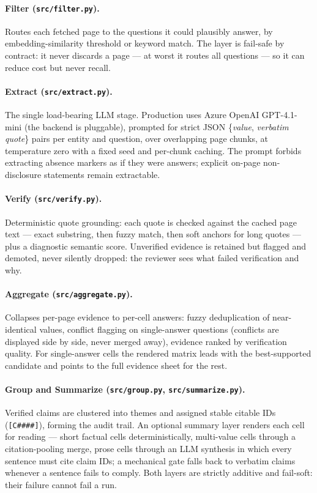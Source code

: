 \documentclass[11pt,a4paper]{report}
\begin{document}
\paragraph{Filter (\texttt{src/filter.py}).} Routes each fetched page to the
questions it could plausibly answer, by embedding-similarity threshold or
keyword match. The layer is fail-safe by contract: it never discards a
page --- at worst it routes all questions --- so it can reduce cost but never
recall.

\paragraph{Extract (\texttt{src/extract.py}).} The single load-bearing LLM
stage. Production uses Azure OpenAI GPT-4.1-mini (the backend is pluggable),
prompted for strict JSON \{\emph{value}, \emph{verbatim quote}\} pairs per
entity and question, over overlapping page chunks, at temperature zero with
a fixed seed and per-chunk caching. The prompt forbids extracting absence
markers as if they were answers; explicit on-page non-disclosure statements
remain extractable.

\paragraph{Verify (\texttt{src/verify.py}).} Deterministic quote grounding:
each quote is checked against the cached page text --- exact substring, then
fuzzy match, then soft anchors for long quotes --- plus a diagnostic semantic
score. Unverified evidence is retained but flagged and demoted, never
silently dropped: the reviewer sees what failed verification and why.

\paragraph{Aggregate (\texttt{src/aggregate.py}).} Collapses per-page
evidence to per-cell answers: fuzzy deduplication of near-identical values,
conflict flagging on single-answer questions (conflicts are displayed
side by side, never merged away), evidence ranked by verification quality.
For single-answer cells the rendered matrix leads with the best-supported
candidate and points to the full evidence sheet for the rest.

\paragraph{Group and Summarize (\texttt{src/group.py},
\texttt{src/summarize.py}).} Verified claims are clustered into themes and
assigned stable citable IDs (\texttt{[C\#\#\#\#]}), forming the audit trail.
An optional summary layer renders each cell for reading --- short factual
cells deterministically, multi-value cells through a citation-pooling merge,
prose cells through an LLM synthesis in which every sentence must cite claim
IDs; a mechanical gate falls back to verbatim claims whenever a sentence
fails to comply. Both layers are strictly additive and fail-soft: their
failure cannot fail a run.
\end{document}

